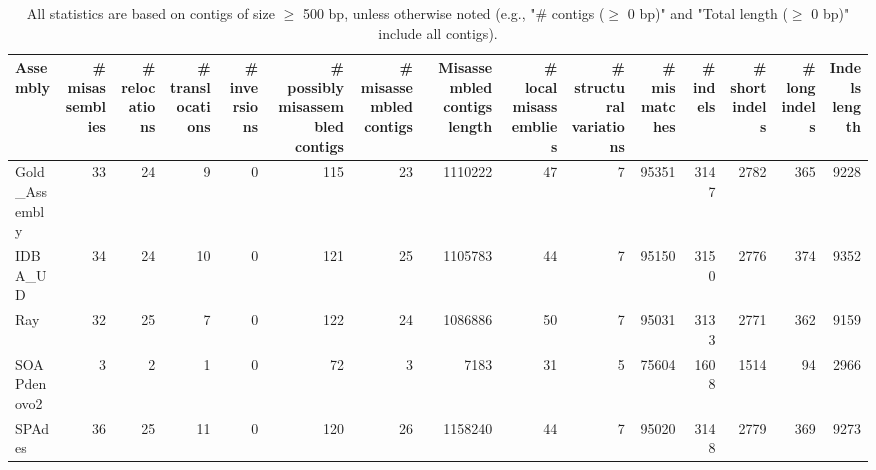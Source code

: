 \documentclass[12pt,a4paper]{article}
\begin{document}
\begin{table}[ht]
\begin{center}
\caption{All statistics are based on contigs of size $\geq$ 500 bp, unless otherwise noted (e.g., "\# contigs ($\geq$ 0 bp)" and "Total length ($\geq$ 0 bp)" include all contigs).}
\begin{tabular}{|l*{14}{|r}|}
\hline
Assembly & \# misassemblies &     \# relocations &     \# translocations &     \# inversions & \# possibly misassembled contigs & \# misassembled contigs & Misassembled contigs length & \# local misassemblies & \# structural variations & \# mismatches & \# indels &     \# short indels &     \# long indels & Indels length \\ \hline
Gold\_Assembly & 33 & 24 & 9 & 0 & 115 & 23 & 1110222 & 47 & 7 & 95351 & 3147 & 2782 & 365 & 9228 \\ \hline
IDBA\_UD & 34 & 24 & 10 & 0 & 121 & 25 & 1105783 & 44 & 7 & 95150 & 3150 & 2776 & 374 & 9352 \\ \hline
Ray & 32 & 25 & 7 & 0 & 122 & 24 & 1086886 & 50 & 7 & 95031 & 3133 & 2771 & 362 & 9159 \\ \hline
SOAPdenovo2 & 3 & 2 & 1 & 0 & 72 & 3 & 7183 & 31 & 5 & 75604 & 1608 & 1514 & 94 & 2966 \\ \hline
SPAdes & 36 & 25 & 11 & 0 & 120 & 26 & 1158240 & 44 & 7 & 95020 & 3148 & 2779 & 369 & 9273 \\ \hline
\end{tabular}
\end{center}
\end{table}
\end{document}
